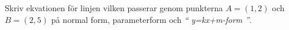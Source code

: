  Skriv ekvationen för linjen vilken passerar genom punkterna $A=(1,2)$ och 
$B=(2,5)$ på normal form, parameterform och {\it `` y=kx+m-form ''}.